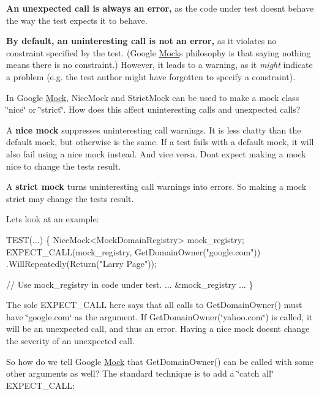 {\bfseries An unexpected call is always an error,} as the code under test doesn\textquotesingle{}t behave the way the test expects it to behave.

{\bfseries By default, an uninteresting call is not an error,} as it violates no constraint specified by the test. (Google \hyperlink{classMock}{Mock}\textquotesingle{}s philosophy is that saying nothing means there is no constraint.) However, it leads to a warning, as it {\itshape might} indicate a problem (e.\+g. the test author might have forgotten to specify a constraint).

In Google \hyperlink{classMock}{Mock}, {\ttfamily Nice\+Mock} and {\ttfamily Strict\+Mock} can be used to make a mock class \char`\"{}nice\char`\"{} or \char`\"{}strict\char`\"{}. How does this affect uninteresting calls and unexpected calls?

A {\bfseries nice mock} suppresses uninteresting call warnings. It is less chatty than the default mock, but otherwise is the same. If a test fails with a default mock, it will also fail using a nice mock instead. And vice versa. Don\textquotesingle{}t expect making a mock nice to change the test\textquotesingle{}s result.

A {\bfseries strict mock} turns uninteresting call warnings into errors. So making a mock strict may change the test\textquotesingle{}s result.

Let\textquotesingle{}s look at an example\+:


\begin{DoxyCode}
TEST(...) \{
  NiceMock<MockDomainRegistry> mock\_registry;
  EXPECT\_CALL(mock\_registry, GetDomainOwner(\textcolor{stringliteral}{"google.com"}))
          .WillRepeatedly(Return(\textcolor{stringliteral}{"Larry Page"}));

  \textcolor{comment}{// Use mock\_registry in code under test.}
  ... &mock\_registry ...
\}
\end{DoxyCode}


The sole {\ttfamily E\+X\+P\+E\+C\+T\+\_\+\+C\+A\+LL} here says that all calls to {\ttfamily Get\+Domain\+Owner()} must have {\ttfamily \char`\"{}google.\+com\char`\"{}} as the argument. If {\ttfamily Get\+Domain\+Owner(\char`\"{}yahoo.\+com\char`\"{})} is called, it will be an unexpected call, and thus an error. Having a nice mock doesn\textquotesingle{}t change the severity of an unexpected call.

So how do we tell Google \hyperlink{classMock}{Mock} that {\ttfamily Get\+Domain\+Owner()} can be called with some other arguments as well? The standard technique is to add a \char`\"{}catch all\char`\"{} {\ttfamily E\+X\+P\+E\+C\+T\+\_\+\+C\+A\+LL}\+:


